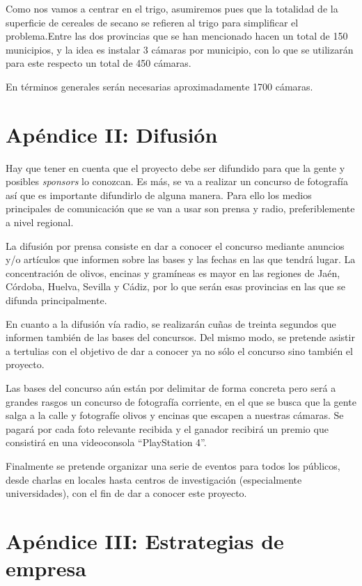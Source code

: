\documentclass[12pt,oneside,a4paper]{article}
\numberwithin{figure}{section}
\begin{document}
Como nos vamos a centrar en el trigo, asumiremos pues que la totalidad de la superficie de cereales de secano se refieren al trigo para simplificar el problema.Entre las dos provincias que se han mencionado hacen un total de 150 municipios, y la idea es instalar 3 cámaras por municipio, con lo que se utilizarán para este respecto un total de 450 cámaras.

En términos generales serán necesarias aproximadamente 1700 cámaras.


\section{Apéndice II: Difusión}

Hay que tener en cuenta que el proyecto debe ser difundido para que la gente y posibles \textit{sponsors} lo conozcan. Es más, se va a realizar un concurso de fotografía así que es importante difundirlo de alguna manera. Para ello los medios principales de comunicación que se van a usar son prensa y radio, preferiblemente a nivel regional.

La difusión por prensa consiste en dar a conocer el concurso mediante anuncios y/o artículos que informen sobre las bases y las fechas en las que tendrá lugar. La concentración de olivos, encinas y gramíneas es mayor en las regiones de Jaén, Córdoba, Huelva, Sevilla y Cádiz, por lo que serán esas provincias en las que se difunda principalmente.

En cuanto a la difusión vía radio, se realizarán cuñas de treinta segundos que informen también de las bases del concursos. Del mismo modo, se pretende asistir a tertulias con el objetivo de dar a conocer ya no sólo el concurso sino también el proyecto.

Las bases del concurso aún están por delimitar de forma concreta pero será a grandes rasgos un concurso de fotografía corriente, en el que se busca que la gente salga a la calle y fotografíe olivos y encinas que escapen a nuestras cámaras. Se pagará por cada foto relevante recibida y el ganador recibirá un premio que consistirá en una videoconsola “PlayStation 4”.

Finalmente se pretende organizar una serie de eventos para todos los públicos, desde charlas en locales hasta centros de investigación (especialmente universidades), con el fin de dar a conocer este proyecto.


\section{Apéndice III: Estrategias de empresa}
\end{document}
